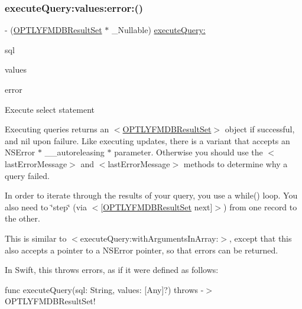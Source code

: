\subsubsection{\texorpdfstring{execute\+Query\+:values\+:error\+:()}{executeQuery:values:error:()}}
{\footnotesize\ttfamily -\/ (\mbox{\hyperlink{interface_o_p_t_l_y_f_m_d_b_result_set}{O\+P\+T\+L\+Y\+F\+M\+D\+B\+Result\+Set}} $\ast$ \+\_\+\+Nullable) \mbox{\hyperlink{interface_o_p_t_l_y_f_m_d_b_database_ad749b1bd0f19dc48b36867d1622d201a}{execute\+Query\+:}} \begin{DoxyParamCaption}\item[{(N\+S\+String $\ast$)}]{sql }\item[{values:(N\+S\+Array $\ast$\+\_\+\+Nullable)}]{values }\item[{error:(N\+S\+Error $\ast$\+\_\+\+Nullable \+\_\+\+\_\+autoreleasing $\ast$)}]{error }\end{DoxyParamCaption}}

Execute select statement

Executing queries returns an {\ttfamily $<$\mbox{\hyperlink{interface_o_p_t_l_y_f_m_d_b_result_set}{O\+P\+T\+L\+Y\+F\+M\+D\+B\+Result\+Set}}$>$} object if successful, and {\ttfamily nil} upon failure. Like executing updates, there is a variant that accepts an {\ttfamily N\+S\+Error $\ast$ \+\_\+\+\_\+autoreleasing $\ast$} parameter. Otherwise you should use the {\ttfamily $<$last\+Error\+Message$>$} and {\ttfamily $<$last\+Error\+Message$>$} methods to determine why a query failed.

In order to iterate through the results of your query, you use a {\ttfamily while()} loop. You also need to \char`\"{}step\char`\"{} (via {\ttfamily $<$\mbox{[}\mbox{\hyperlink{interface_o_p_t_l_y_f_m_d_b_result_set}{O\+P\+T\+L\+Y\+F\+M\+D\+B\+Result\+Set}} next\mbox{]}$>$}) from one record to the other.

This is similar to {\ttfamily $<$execute\+Query\+:with\+Arguments\+In\+Array\+:$>$}, except that this also accepts a pointer to a {\ttfamily N\+S\+Error} pointer, so that errors can be returned.

In Swift, this throws errors, as if it were defined as follows\+:

{\ttfamily func execute\+Query(sql\+: String, values\+: \mbox{[}Any\mbox{]}?) throws -\/$>$ O\+P\+T\+L\+Y\+F\+M\+D\+B\+Result\+Set!}


